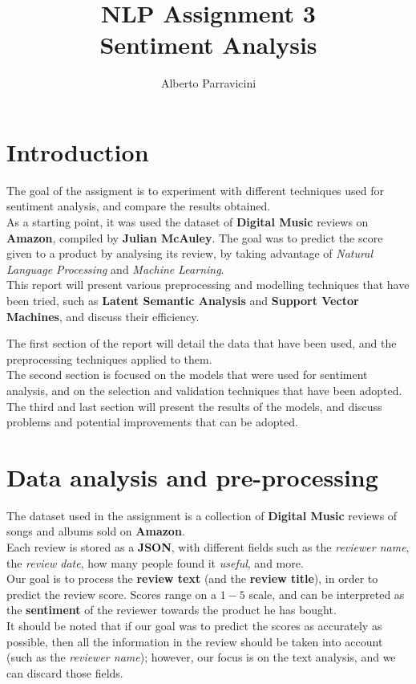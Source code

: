\documentclass[
12pt,
a4paper,
oneside,
headinclude,
footinclude]{article}
\title{\textbf{NLP Assignment 3 \\ Sentiment Analysis}}
\author{{Alberto Parravicini}}
\date{}	%
\theoremstyle{definition} %
\begin{document}
\maketitle
{}
\setcounter{page}{1}

\section{Introduction}
The goal of the assigment is to experiment with different techniques used for sentiment analysis, and compare the results obtained. \\
As a starting point, it was used the dataset of \textbf{Digital Music} reviews on \textbf{Amazon}, compiled by \textbf{Julian McAuley}. The goal was to predict the score given to a product by analysing its review, by taking advantage of \textit{Natural Language Processing} and \textit{Machine Learning}.\\
This report will present various preprocessing and modelling techniques that have been tried, such as \textbf{Latent Semantic Analysis} and \textbf{Support Vector Machines},
and discuss their efficiency.

The first section of the report will detail the data that have been used, and the preprocessing techniques applied to them.\\
The second section is focused on the models that were used for sentiment analysis, and on the selection and validation techniques that have been adopted.
The third and last section will present the results of the models, and discuss problems and potential improvements that can be adopted.

\section{Data analysis and pre-processing}
The dataset used in the assignment is a collection of \textbf{Digital Music} reviews of songs and albums sold on \textbf{Amazon}. \\
Each review is stored as a \textbf{JSON}, with different fields such as the \textit{reviewer name}, the \textit{review date}, how many people found it \textit{useful}, and more.\\
Our goal is to process the \textbf{review text} (and the \textbf{review title}), in order to predict the review score. Scores range on a $1-5$ scale, and can be interpreted as the \textbf{sentiment} of the reviewer towards the product he has bought.\\
It should be noted that if our goal was to predict the scores as accurately as possible, then all the information in the review should be taken into account (such as the \textit{reviewer name}); however, our focus is on the text analysis, and we can discard those fields.
\end{document}
